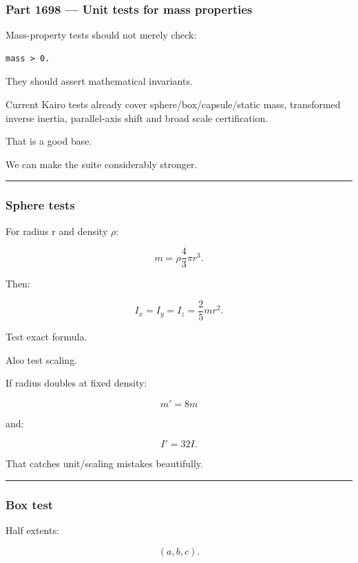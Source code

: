 \subsubsection{Part 1698 --- Unit tests for mass properties}\label{part-1698-unit-tests-for-mass-properties}

Mass-property tests should not merely check:

\begin{verbatim}
mass > 0.
\end{verbatim}

They should assert mathematical invariants.

Current Kairo tests already cover sphere/box/capsule/static mass, transformed inverse inertia, parallel-axis shift and broad scale certification.

That is a good base.

We can make the suite considerably stronger.

\begin{center}\rule{0.5\linewidth}{0.5pt}\end{center}

\subsubsection{Sphere tests}\label{sphere-tests}

For radius r and density \(\rho\):

\[
m
=
\rho
\frac43\pi r^3.
\]

Then:

\[
I_x=I_y=I_z
=
\frac25mr^2.
\]

Test exact formula.

Also test scaling.

If radius doubles at fixed density:

\[
m'=
8m
\]

and:

\[
I'=
32I.
\]

That catches unit/scaling mistakes beautifully.

\begin{center}\rule{0.5\linewidth}{0.5pt}\end{center}

\subsubsection{Box test}\label{box-test}

Half extents:

\[
(a,b,c).
\]

